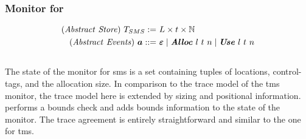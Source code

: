 \documentclass[dvipsnames]{llncs}
\begin{document}
\subsubsection{Monitor for }\label{subsubsec:sms}
\begin{gather*}
  \begin{aligned}
    \mi{(Abstract\ Store)}~\smsmonitor:=&\ L\times\sandboxtag\times\mb{N}\\
    \mi{(Abstract\ Events)}~\absevent\bnfdef&\ \absev{\varepsilon} \mid \absev{Alloc\ }\loc\ \sandboxtag\ n \mid \absev{Use\ }\loc\ \sandboxtag\ n \\
  \end{aligned}
\end{gather*}
\begin{center}
  $\;$\\
\end{center}
The state of the monitor for \gls*{sms} is a set containing tuples of locations, control-tags, and the allocation size.
In comparison to the trace model of the \gls*{tms} monitor, the trace model here is extended by sizing and positional information.
 performs a bounds check and  adds bounds information to the state of the monitor.
The trace agreement is entirely straightforward and similar to the one for \gls*{tms}.
\end{document}
